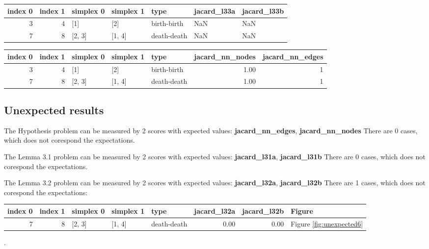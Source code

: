 \documentclass{article}
\begin{document}
\begin{center}
\begin{tabular}{rrlllll}
\toprule
index 0 & index 1 & simplex 0 & simplex 1 & type & jacard\_l33a & jacard\_l33b \\
\midrule
3 & 4 & [1] & [2] & birth-birth & NaN & NaN \\
7 & 8 & [2, 3] & [1, 4] & death-death & NaN & NaN \\
\bottomrule
\end{tabular}
\end{center}

\begin{center}
\begin{tabular}{rrlllrr}
\toprule
index 0 & index 1 & simplex 0 & simplex 1 & type & jacard\_nn\_nodes & jacard\_nn\_edges \\
\midrule
3 & 4 & [1] & [2] & birth-birth & 1.00 & 1 \\
7 & 8 & [2, 3] & [1, 4] & death-death & 1.00 & 1 \\
\bottomrule
\end{tabular}
\end{center}


\subsection{Unexpected results}

    \par The Hypothesis problem can be measured by 2 scores with expected 
    values: \textbf{jacard\_nn\_edges}, \textbf{jacard\_nn\_nodes}
    There are 0 cases, which does not corespond the expectations. 
    
    \par The Lemma 3.1 problem can be measured by 2 scores with expected 
    values: \textbf{jacard\_l31a}, \textbf{jacard\_l31b}
    There are 0 cases, which does not corespond the expectations. 
    
    \par The Lemma 3.2 problem can be measured by 2 scores with expected 
    values: \textbf{jacard\_l32a}, \textbf{jacard\_l32b}
    There are 1 cases, which does not corespond the expectations: 
\begin{center}
\begin{tabular}{rrlllrrl}
\toprule
index 0 & index 1 & simplex 0 & simplex 1 & type & jacard\_l32a & jacard\_l32b & Figure \\
\midrule
7 & 8 & [2, 3] & [1, 4] & death-death & 0.00 & 0.00 & Figure \ref{fig:unexpected6} \\
\bottomrule
\end{tabular}
\end{center}.
    
\end{document}
